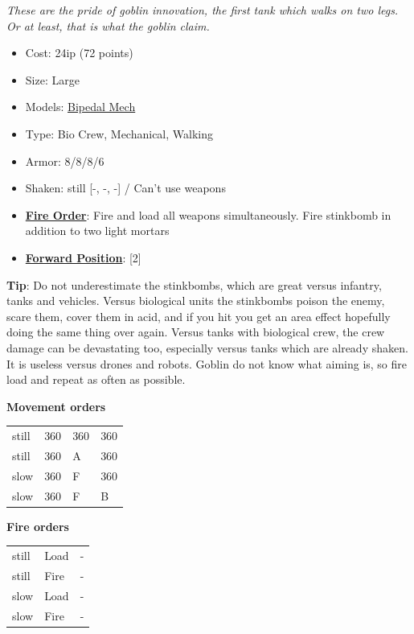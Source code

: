 \documentclass[a4paper,12pt]{article}
\begin{document}
\textit{These are the pride of goblin innovation, the first tank which walks on two legs. Or at least, that is what the goblin claim.}

\begin{itemize}
\item Cost: 24ip (72 points)
\item Size: Large
\item Models: \hyperref[model-bipedal-mech]{Bipedal Mech}
\item Type: Bio Crew, Mechanical, Walking
\item Armor: 8/8/8/6
\item Shaken: still [-, -, -] / Can't use weapons
\item \textbf{\hyperref[rule-special-fire-order]{Fire Order}}: Fire and load all weapons simultaneously. Fire stinkbomb in addition to two light mortars
\item \textbf{\hyperref[rule-special-forward-position]{Forward Position}}: [2]

\end{itemize}
\noindent\textbf{Tip}: Do not underestimate the stinkbombs, which are great versus infantry, tanks and vehicles. Versus biological units the stinkbombs poison the enemy, scare them, cover them in acid, and if you hit you get an area effect hopefully doing the same thing over again. Versus tanks with biological crew, the crew damage can be devastating too, especially versus tanks which are already shaken. It is useless versus drones and robots. Goblin do not know what aiming is, so fire load and repeat as often as possible.

\noindent\textbf{Movement orders}

\begin{tabular}{llll}
still & 360\textdegree{} & 360\textdegree{} & 360\textdegree{} \\
still & 360\textdegree{} & A & 360\textdegree{} \\
slow & 360\textdegree{} & F & 360\textdegree{} \\
slow & 360\textdegree{} & F & B \\
\end{tabular}
\vspace{1ex}


\noindent\textbf{Fire orders}

\begin{tabular}{lll}
still & Load & - \\
still & Fire & - \\
slow & Load & - \\
slow & Fire & - \\
\end{tabular}
\vspace{1ex}
\end{document}
